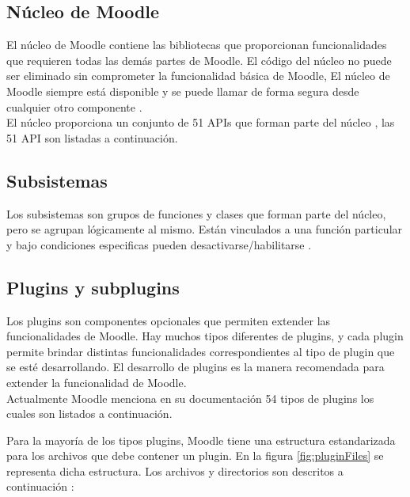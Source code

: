 \subsection{Núcleo de Moodle}
El núcleo de Moodle contiene las bibliotecas que proporcionan funcionalidades que requieren todas las demás partes de Moodle. El código del núcleo no puede ser eliminado sin comprometer la funcionalidad básica de Moodle, El núcleo de Moodle siempre está disponible y se puede llamar de forma segura desde cualquier otro componente \cite{moodleComponets}. \\

\noindent El núcleo proporciona un conjunto de 51 APIs que forman parte del núcleo \cite{moodleCoreAPIs}, las 51 API son listadas a continuación.

\begin{multicols}{3}
    
\end{multicols}
\subsection{Subsistemas}
Los subsistemas son grupos de funciones y clases que forman parte del núcleo, pero se agrupan lógicamente al mismo. Están vinculados a una función particular y bajo condiciones especificas pueden desactivarse/habilitarse \cite{moodleComponets}.
    
\subsection{Plugins y subplugins}\label{subsec:plugins}
Los plugins son componentes opcionales que permiten extender las funcionalidades de Moodle. Hay muchos tipos diferentes de plugins, y cada plugin permite brindar distintas funcionalidades correspondientes al tipo de plugin que se esté desarrollando. El desarrollo de plugins es la manera recomendada para extender la funcionalidad de Moodle.\\

\noindent Actualmente Moodle menciona en su documentación 54 tipos de plugins los cuales son listados a continuación.

\begin{multicols}{3}
    
\end{multicols}

\clearpage
\noindent Para la mayoría de los tipos plugins, Moodle tiene una estructura estandarizada para los archivos que debe contener un plugin. En la figura \ref{fig:pluginFiles} se representa dicha estructura. Los archivos y directorios son descritos a continuación \cite{moodlePluginfiles}:

